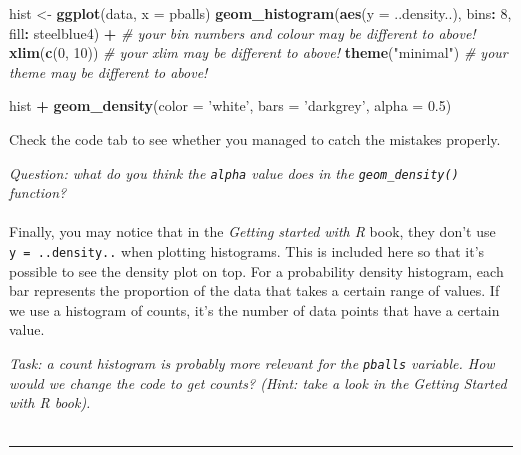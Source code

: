 \documentclass[
]{book}
\newenvironment{Shaded}{\begin{snugshade}}{\end{snugshade}}
\newcommand{\CommentTok}[1]{\textcolor[rgb]{0.56,0.35,0.01}{\textit{#1}}}
\newcommand{\DataTypeTok}[1]{\textcolor[rgb]{0.13,0.29,0.53}{#1}}
\newcommand{\DecValTok}[1]{\textcolor[rgb]{0.00,0.00,0.81}{#1}}
\newcommand{\FloatTok}[1]{\textcolor[rgb]{0.00,0.00,0.81}{#1}}
\newcommand{\KeywordTok}[1]{\textcolor[rgb]{0.13,0.29,0.53}{\textbf{#1}}}
\newcommand{\NormalTok}[1]{#1}
\newcommand{\OperatorTok}[1]{\textcolor[rgb]{0.81,0.36,0.00}{\textbf{#1}}}
\newcommand{\StringTok}[1]{\textcolor[rgb]{0.31,0.60,0.02}{#1}}
\begin{document}
\begin{Shaded}
\begin{Highlighting}[]
\NormalTok{hist <-}\StringTok{ }\KeywordTok{ggplot}\NormalTok{(data, }\DataTypeTok{x =}\NormalTok{ pballs)}
    \KeywordTok{geom_histogram}\NormalTok{(}\KeywordTok{aes}\NormalTok{(}\DataTypeTok{y =}\NormalTok{ ..density..), bins}\OperatorTok{:}\StringTok{ }\DecValTok{8}\NormalTok{, fill}\OperatorTok{:}\StringTok{ }\NormalTok{steelblue4) }\OperatorTok{+}\StringTok{ }
\StringTok{    }\CommentTok{# your bin numbers and colour may be different to above!}
\StringTok{    }\KeywordTok{xlim}\NormalTok{(}\KeywordTok{c}\NormalTok{(}\DecValTok{0}\NormalTok{, }\DecValTok{10}\NormalTok{))}
    \CommentTok{# your xlim may be different to above!}
    \KeywordTok{theme}\NormalTok{(}\StringTok{"minimal"}\NormalTok{)}
    \CommentTok{# your theme may be different to above!}

\NormalTok{hist }\OperatorTok{+}\StringTok{ }\KeywordTok{geom_density}\NormalTok{(}\DataTypeTok{color =} \StringTok{'white'}\NormalTok{, }\DataTypeTok{bars =} \StringTok{'darkgrey'}\NormalTok{, }\DataTypeTok{alpha =} \FloatTok{0.5}\NormalTok{)}
\end{Highlighting}
\end{Shaded}

Check the code tab to see whether you managed to catch the mistakes properly.

\emph{Question: what do you think the \texttt{alpha} value does in the \texttt{geom\_density()}
function?}\\
~\\

Finally, you may notice that in the \emph{Getting started with R} book, they don't
use \texttt{y\ =\ ..density..} when plotting histograms. This is included here so that
it's possible to see the density plot on top. For a probability density histogram,
each bar represents the proportion of the data that takes a certain range of
values. If we use a histogram of counts, it's the number of data points that
have a certain value.

\emph{Task: a count histogram is probably more relevant for the \texttt{pballs} variable.
How would we change the code to get counts? (Hint: take a look in the
Getting Started with R book).}\\
~\\

\begin{center}\rule{0.5\linewidth}{0.5pt}\end{center}
\end{document}
